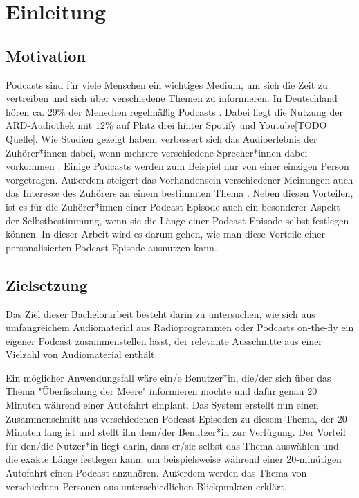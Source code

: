 \chapter{Einleitung}\label{ch:intro}

\section{Motivation}

Podcasts sind für viele Menschen ein wichtiges Medium, um sich die Zeit zu vertreiben und sich über verschiedene Themen zu informieren. 
In Deutschland hören ca. 29\% der Menschen regelmäßig Podcasts \cite{newman2022}.
Dabei liegt die Nutzung der ARD-Audiothek mit 12\% auf Platz drei hinter Spotify und Youtube[TODO Quelle].
Wie Studien gezeigt haben, verbessert sich das Audioerlebnis der Zuhörer*innen dabei, wenn mehrere verschiedene Sprecher*innen dabei vorkommen \cite{kang2012}. 
Einige Podcasts werden zum Beispiel nur von einer einzigen Person vorgetragen.
Außerdem steigert das Vorhandensein verschiedener Meinungen auch das Interesse des Zuhörers an einem bestimmten Thema \cite{phillips2014}.
Neben diesen Vorteilen, ist es für die Zuhörer*innen einer Podcast Episode auch ein besonderer Aspekt der Selbstbestimmung, wenn sie die Länge einer Podcast Episode selbst festlegen können.
In dieser Arbeit wird es darum gehen, wie man diese Vorteile einer personalisierten Podcast Episode ausnutzen kann.


\section{Zielsetzung}


Das Ziel dieser Bachelorarbeit besteht darin zu untersuchen, wie sich aus umfangreichem Audiomaterial aus Radioprogrammen oder Podcasts on-the-fly ein eigener Podcast zusammenstellen lässt, der relevante Ausschnitte aus einer Vielzahl von Audiomaterial enthält.

Ein möglicher Anwendungsfall wäre ein/e Benutzer*in, die/der sich über das Thema "Überfischung der Meere" informieren möchte und dafür genau 20 Minuten während einer Autofahrt einplant. 
Das System erstellt nun einen Zusammenschnitt aus verschiedenen Podcast Episoden zu diesem Thema, der 20 Minuten lang ist und stellt ihn dem/der Benutzer*in zur Verfügung. 
Der Vorteil für den/die Nutzer*in liegt darin, dass er/sie selbst das Thema auswählen und die exakte Länge festlegen kann, um beispielsweise während einer 20-minütigen Autofahrt einen Podcast anzuhören. 
Außerdem werden das Thema von verschiednen Personen aus unterschiedlichen Blickpunkten erklärt. 

